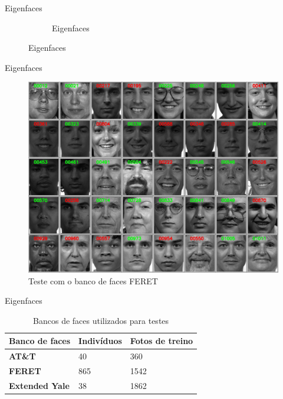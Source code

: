\begin{frame}{Eigenfaces}
\begin{figure}[htbp]
\begin{subfigure}[t]{0.3\textwidth}
    \caption{Eigenfaces}
    \end{subfigure}
\end{figure}
\end{frame}


\begin{frame}{Eigenfaces}
\begin{figure}[htbp]
    \centering
    \caption{Teste com o banco de faces FERET}
    \label{fig:eigenfaces_resultado_feret}
    \includegraphics[width=0.8\linewidth]{imagens/eigenfaces_resultado_feret.jpg}
\end{figure}
\end{frame}


\begin{frame}{Eigenfaces}
\begin{table}[htpb]
\centering
\caption{Bancos de faces utilizados para testes}
\label{tab:bancos_faces}
\begin{tabular}{|l|l|l|}
\hline
\textbf{Banco de faces} & \textbf{Indivíduos} & \textbf{Fotos de treino} \\\hline
\textbf{AT\&T}          & 40                  & 360                      \\\hline
\textbf{FERET}          & 865                 & 1542                     \\\hline
\textbf{Extended Yale}  & 38                  & 1862                     \\\hline
\end{tabular}
\end{table}
\end{frame}


